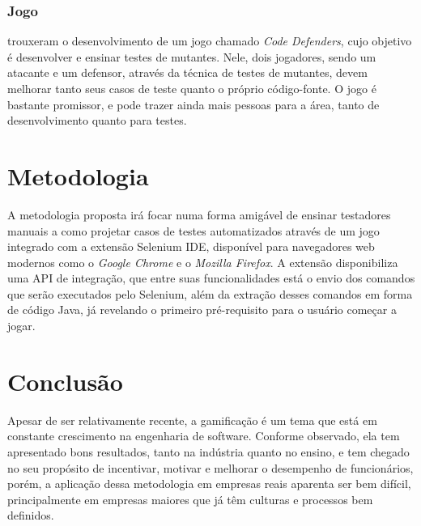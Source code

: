 \documentclass[twoside,english,brazilian]{UNISINOSartigo}
\begin{document}
\subsubsection{Jogo}

\cite{Rojas} trouxeram o desenvolvimento de um jogo chamado \textit{Code Defenders}, cujo objetivo é desenvolver e ensinar testes de mutantes. Nele, dois jogadores, sendo um atacante e um defensor, através da técnica de testes de mutantes, devem melhorar tanto seus casos de teste quanto o próprio código-fonte. O jogo é bastante promissor, e pode trazer ainda mais pessoas para a área, tanto de desenvolvimento quanto para testes. 


\section{Metodologia}

A metodologia proposta irá focar numa forma amigável de ensinar testadores manuais a como projetar casos de testes automatizados através de um jogo integrado com a extensão Selenium IDE, disponível para navegadores web modernos como o \textit{Google Chrome} e o \textit{Mozilla Firefox}. A extensão disponibiliza uma API de integração, que entre suas funcionalidades está o envio dos comandos que serão executados pelo Selenium, além da extração desses comandos em forma de código Java, já revelando o primeiro pré-requisito para o usuário começar a jogar.



\section{Conclusão}
Apesar de ser relativamente recente, a gamificação é um tema que está em constante crescimento na engenharia de software. Conforme observado, ela tem apresentado bons resultados, tanto na indústria quanto no ensino, e tem chegado no seu propósito de incentivar, motivar e melhorar o desempenho de funcionários, porém, a aplicação dessa metodologia em empresas reais aparenta ser bem difícil, principalmente em empresas maiores que já têm culturas e processos bem definidos. 
\end{document}
